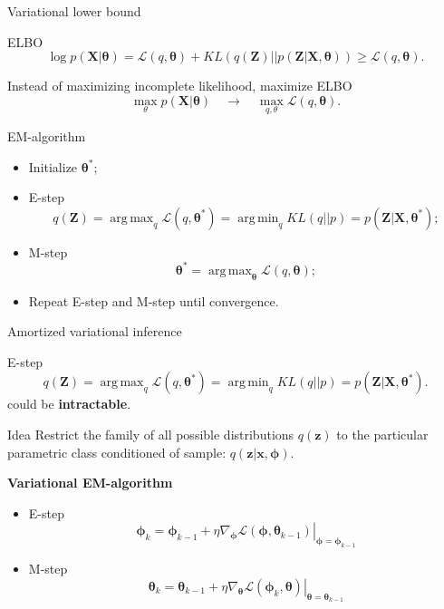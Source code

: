 \documentclass{beamer}
\newcommand{\bx}{\mathbf{x}}
\newcommand{\bz}{\mathbf{z}}
\newcommand{\bX}{\mathbf{X}}
\newcommand{\bZ}{\mathbf{Z}}
\newcommand{\bphi}{\boldsymbol{\phi}}
\newcommand{\btheta}{\boldsymbol{\theta}}
\DeclareMathOperator*{\argmin}{arg\,min}
\DeclareMathOperator*{\argmax}{arg\,max}
\begin{document}
\begin{frame}{Variational lower bound}
	\begin{block}{ELBO}
		\vspace{-0.1cm}
		\[
		\log p(\bX| \btheta) = \mathcal{L} (q, \btheta) + KL(q(\bZ) || p(\bZ|\bX, \btheta)) \geq \mathcal{L} (q, \btheta).
		\]
	\end{block}
	Instead of maximizing incomplete likelihood, maximize ELBO
	\[
		\max_{\theta} p(\bX | \btheta) \quad \rightarrow \quad \max_{q, \theta} \mathcal{L} (q, \btheta).
	\]
	\vspace{-0.4cm}
	\begin{block}{EM-algorithm}
		\begin{itemize}
			\item Initialize $\btheta^*$;
			\item E-step
			\[
			q(\bZ) = \argmax_q \mathcal{L} (q, \btheta^*) = \argmin_q KL(q || p) =
			p(\bZ| \bX, \btheta^*);
			\]
			\item M-step
			\[
			\btheta^* = \argmax_{\btheta} \mathcal{L} (q, \btheta);
			\]
			\item Repeat E-step and M-step until convergence.
		\end{itemize}
	\end{block}

\end{frame}
\begin{frame}{Amortized variational inference}
	\begin{block}{E-step}
		\vspace{-0.3cm}
		\[
		q(\bZ) = \argmax_q \mathcal{L} (q, \btheta^*) = \argmin_q KL(q || p) =
		p(\bZ| \bX, \btheta^*).
		\]
		could be \textbf{intractable}.
	\end{block}
	\begin{block}{Idea}
		Restrict the family of all possible distributions $q(\bz)$ to the particular parametric class conditioned of sample: $q(\bz|\bx, \bphi)$.
	\end{block}
	
	\textbf{Variational EM-algorithm}
	\begin{itemize}
		\item E-step
		\[
		\bphi_k = \bphi_{k-1} + \left.\eta \nabla_{\bphi} \mathcal{L}(\bphi, \btheta_{k-1})\right|_{\bphi=\bphi_{k-1}}
		\]
		\item M-step
		\[
		\btheta_k = \btheta_{k-1} + \left.\eta \nabla_{\btheta} \mathcal{L}(\bphi_k, \btheta)\right|_{\btheta=\btheta_{k-1}}
		\]
	\end{itemize}
\end{frame}
\end{document}
